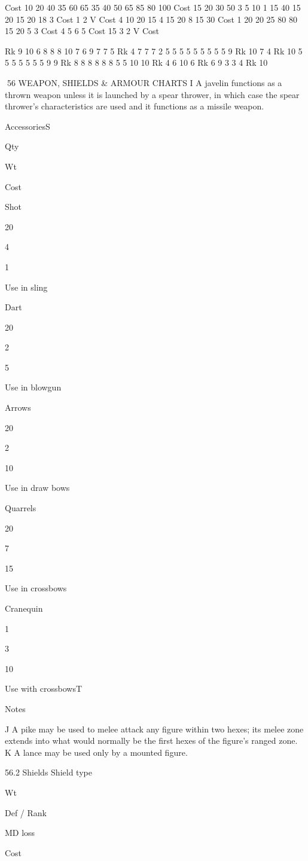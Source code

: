 \documentclass[a4paper]{article}
\begin{document}
\begin{multicols}{3}
Cost
10
20
40
35
60
65
35
40
50
65
85
80
100
Cost
15
20
30
50
3
5
10
1
15
40
15
20
15
20
18
3
Cost
1
2
V
Cost
4
10
20
15
4
15
20
8
15
30
Cost
1
20
20
25
80
80
15
20
5
3
Cost
4
5
6
5
Cost
15
3
2
V
Cost

Rk
9
10
6
8
8
8
10
7
6
9
7
7
5
Rk
4
7
7
7
2
5
5
5
5
5
5
5
5
5
9
Rk
10
7
4
Rk
10
5
5
5
5
5
5
5
9
9
Rk
8
8
8
8
8
8
5
5
10
10
Rk
4
6
10
6
Rk
6
9
3
3
4
Rk
10

56 WEAPON, SHIELDS & ARMOUR CHARTS
I A javelin functions as a thrown weapon unless it
is launched by a spear thrower, in which case the
spear thrower’s characteristics are used and it
functions as a missile weapon.

AccessoriesS

Qty

Wt

Cost

Shot

20

4

1

Use in sling

Dart

20

2

5

Use in blowgun

Arrows

20

2

10

Use in draw bows

Quarrels

20

7

15

Use in crossbows

Cranequin

1

3

10

Use with crossbowsT

Notes

J A pike may be used to melee attack any figure
within two hexes; its melee zone extends into what
would normally be the first hexes of the figure’s
ranged zone.
K A lance may be used only by a mounted figure.

56.2 Shields
Shield type

Wt

Def / Rank

MD loss

Cost


\end{multicols}
\end{document}
